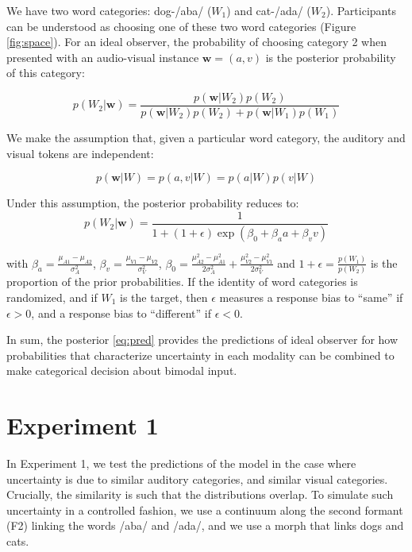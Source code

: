 \documentclass[10pt,letterpaper]{article}
\begin{document}
We have two word categories: dog-/aba/ ($W_1$) and cat-/ada/ ($W_2$). Participants can be understood as choosing one of these two word categories (Figure \ref{fig:space}). For an ideal observer, the probability of choosing category 2 when presented with an audio-visual instance $\mathbf{w}=(a,v)$ is the posterior probability of this category:

\begin{equation}
p(W_2 | \mathbf{w})=\frac{p(\mathbf{w}|W_2)p(W_2)}{p(\mathbf{w}|W_2)p(W_2)+p(\mathbf{w}|W_1)p(W_1)}
\end{equation}

We make the assumption that, given a particular word category, the auditory and visual tokens are independent:

\begin{equation}
p(\mathbf{w} | W) = p(a,v| W) = p(a| W)p(v| W)
\end{equation}

Under this assumption, the posterior probability reduces to:
\begin{equation}
p(W_2 | \mathbf{w})=\frac{1}{1+(1+\epsilon)\exp(\beta_0+\beta_aa+\beta_vv)}
\label{eq:pred}
\end{equation}

\noindent with $\beta_a=\frac{\mu_{A1}-\mu_{A2}}{\sigma^2_{A}}$,
$\beta_v=\frac{\mu_{V1}-\mu_{V2}}{\sigma^2_{V}}$,
$\beta_0=\frac{\mu^2_{A2}-\mu^2_{A1}}{2\sigma^2_{A}}+\frac{\mu^2_{V2}-\mu^2_{V1}}{2\sigma^2_{V}}$
and $1+\epsilon=\frac{p(W_1)}{p(W_2)}$ is the proportion of the prior probabilities. If the identity of word categories is randomized, and if $W_1$ is the target, then $\epsilon$ measures a response bias to ``same'' if $\epsilon > 0 $, and a response bias to ``different'' if $\epsilon < 0 $.

In sum, the posterior \ref{eq:pred} provides the predictions of ideal observer for how probabilities that characterize uncertainty in each modality can be combined to make categorical decision about bimodal input.


\section{Experiment 1}

In Experiment 1, we test the predictions of the model in the case where uncertainty is due to similar auditory categories, and similar visual categories. Crucially, the similarity is such that the distributions overlap. To simulate such uncertainty in a controlled fashion, we use a continuum along the second formant (F2) linking the words /aba/ and /ada/, and we use a morph that links dogs and cats.
\end{document}
